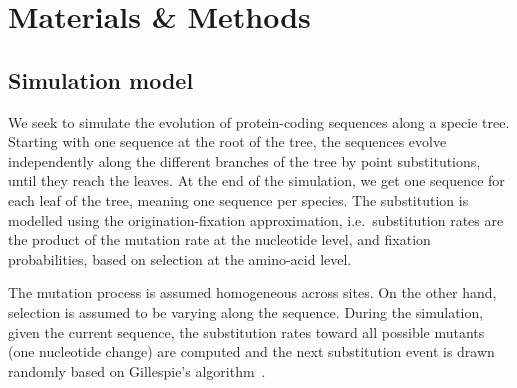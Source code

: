 \documentclass{article}
\begin{document}
\section{Materials \& Methods}

\subsection{Simulation model}
\label{sec:mut-bias-simu}
We seek to simulate the evolution of protein-coding sequences along a specie tree.
Starting with one sequence at the root of the tree, the sequences evolve independently along the different branches of the tree by point {substitutions}, until they reach the leaves.
At the end of the simulation, we get one sequence for each leaf of the tree, meaning one sequence per species.
The {substitution} is modelled using the origination-fixation approximation, i.e.~substitution rates are the product of the mutation rate at the nucleotide level, and fixation probabilities, based on selection at the amino-acid level.

The mutation process is assumed homogeneous across sites.
On the other hand, selection is assumed to be varying along the sequence.
During the simulation, given the current sequence, the {substitution} rates toward all possible mutants (one nucleotide change) are computed and the next {substitution} event is drawn randomly based on Gillespie’s algorithm~\citep{Gillespie1977}.
\end{document}
